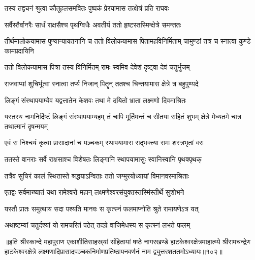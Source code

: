 \twolineshloka
{तस्य तद्वचनं श्रुत्वा कौतूहलसमवितः} 
{पुष्पकं प्रेरयामास तत्क्षेत्रं प्रति राघवः} 

\twolineshloka
{सर्वैस्तैर्वानरैः सार्धं राक्षसैश्च पृथग्विधैः}
{अवतीर्य ततो हृष्टस्तस्मिन्क्षेत्रे समन्ततः}%

\threelineshloka
{तीर्थमालोकयामास पुण्यान्यायतनानि च}
{ततो विलोकयामास पितामहविनिर्मिताम्}
{चामुण्डां तत्र च स्नात्वा कुण्डे कामप्रदायिनि}%

\twolineshloka
{ततो विलोकयामास पित्रा तस्य विनिर्मितम्}
{रामः स्वमिव देवेशं दृष्ट्वा देवं चतुर्भुजम्}%

\twolineshloka
{राजवाप्यां शुचिर्भूत्वा स्नात्वा तर्प्य निजान् पितॄन्}
{ततश्च चिन्तयामास क्षेत्रे त्र बहुपुण्यदे}%

\twolineshloka
{लिङ्गं संस्थापयाम्येव यद्वत्तातेन केशवः}
{तथा मे दयितो भ्राता लक्ष्मणो दिवमाश्रितः}%

\threelineshloka
{यस्तस्य नामनिर्दिष्टं लिङ्गं संस्थापयाम्यहम्}
{तं चापि मूर्तिमन्तं च सीतया सहितं शुभम्}
{क्षेत्रे मेध्यतमे चात्र तथात्मानं दृषन्मयम्}%

\twolineshloka
{एवं स निश्चयं कृत्वा प्रासादानां च पञ्चकम्}
{स्थापयामास सद्भक्त्या रामः शस्त्रभृतां वरः}%

\twolineshloka
{ततस्ते वानराः सर्वे राक्षसाश्च विशेषतः}
{लिङ्गानि स्थापयामासुः स्वानिस्वानि पृथक्पृथक्}%

\twolineshloka
{तत्रैव सुचिरं कालं स्थितास्ते श्रद्धयाऽन्विताः}
{ततो जग्मुरयोध्यायां विमानवरमाश्रिताः}%

\twolineshloka
{एतद्वः सर्वमाख्यातं यथा रामेश्वरो महान्}
{लक्ष्मणेश्वरसंयुक्तस्तस्मिंस्तीर्थे सुशोभने}%

\twolineshloka
{यस्तौ प्रातः समुत्थाय सदा पश्यति मानवः}
{स कृत्स्नं फलमाप्नोति श्रुते रामायणेऽत्र यत्}%

\twolineshloka
{अथाष्टम्यां चतुर्दश्यां यो रामचरितं पठेत्}
{तदग्रे वाजिमेधस्य स कृत्स्नं लभते फलम्}%

॥इति श्रीस्कान्दे महापुराण एकाशीतिसाहस्र्यां संहितायां षष्ठे नागरखण्डे हाटकेश्वरक्षेत्रमाहात्म्ये श्रीरामचन्द्रेण हाटकेश्वरक्षेत्रे लक्ष्मणादिप्रासादपञ्चकनिर्माणप्रतिष्ठापनवर्णनं नाम द्व्युत्तरशततमोऽध्यायः॥१०२॥
